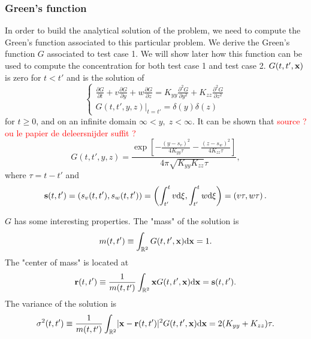 \subsubsection*{Green's function}
In order to build the analytical solution of the problem, we need to compute the Green's function associated to this particular problem. We derive the Green's function $G$ associated to test case 1. We will show later how this function can be used to compute the concentration for both test case 1 and test case 2. $\G$ is zero for $t<t'$ and is the solution of
\begin{equation} \label{eq:testcase_green}
	\begin{cases}
		\frac{\partial G}{\partial t} + v \frac{\partial G}{\partial y} + w\frac{\partial G}{\partial z} = K_{yy}\frac{\partial^2 G}{\partial y^2} + K_{zz}\frac{\partial^2 G}{\partial z^2}\\[.1cm]
		\left. G(t,t',y,z) \right \rvert_{t=t'} = \delta(y)\delta(z) 
	\end{cases}
\end{equation}
for $t \ge 0$, and on an infinite domain $\infty < y,\; z < \infty$. It can be shown that \textcolor{red}{source ? ou le papier de deleersnijder suffit ?}
\begin{equation} 
	G(t,t',y,z) = \frac{\exp\left[-\frac{(y-s_v)^2}{4K_{yy}\tau} -\frac{(z-s_w)^2}{4K_{zz}\tau} \right]}{4\pi\sqrt{K_{yy}K_{zz}}\tau},
\end{equation}
where $\tau = t-t'$ and 
\begin{equation}
	\b s(t,t') = (s_v(t,t'), s_w(t,t')) = \left(\int_{t'}^{t}v \rm d \xi, \int_{t'}^{t}w \rm d \xi \right) = \left(v\tau, w\tau\right).
\end{equation}

$G$ has some interesting properties. The "mass" of the solution is
\begin{equation} \label{eq:testcase:propmass}
	m(t,t') \equiv \int_{\R[2]} \G \rm d \b x = 1.
\end{equation}
The "center of mass" is located at
\begin{equation} \label{eq:testcase:propcenter}
	\b r(t,t') \equiv \frac{1}{m(t,t')} \int_{\R[2]} \b x \G \rm d \b x  = \b s(t,t').
\end{equation}
The variance of the solution is
\begin{equation} \label{eq:testcase:propvar}
	\sigma^2(t,t') \equiv \frac{1}{m(t,t')} \int_{\R[2]} \lvert \b x - \b r(t,t') \rvert^2 \G \rm d \b x = 2 (K_{yy}+K_{zz}) \tau.
\end{equation}

